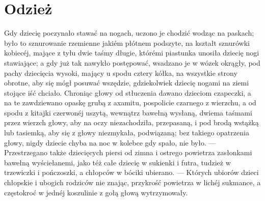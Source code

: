 \documentclass{book}
\begin{document}
\section{Odzież}

Gdy dziecię poczynało stawać na nogach, uczono je chodzić wodząc na paskach; było to sznurowanie rzemienne jakiém płótnem podszyte, na kształt sznurówki kobiecéj, mające z tyłu dwie taśmy długie, którémi piastunka unosiła dziecię nogi stawiające; a gdy już tak nawykło postępować, wsadzano je w wózek okrągły, pod pachy dziecięcia wysoki, mający u spodu cztery kółka, na wszystkie strony obrotne, aby się mógł posuwać wszędzie, gdziekolwiek dziecię nogami na ziemi stojące iść chciało. Chroniąc głowy od stłuczenia dawano dzieciom czapeczki, a na te zawdziewano opaskę grubą z axamitu, pospolicie czarnego z wierzchu, a od spodu z kitajki czerwonéj uszytą, wewnątrz bawełną wysłaną, dwiema taśmami przez wierzch głowy, aby na oczy niezachodziła, przepasaną, i pod brodą wstążką lub tasiemką, aby się z głowy niezmykała, podwiązaną; bez takiego opatrzenia głowy, nigdy dziecie chyba na noc w kolebce gdy spało, nie było. — Przestrzegano także dziecięcych piersi od zimna i ostrego powietrza zasłonkami bawełną wyściełanemi, jako téż całe dziecię w sukienki i futra, tudzież w trzewiczki i pończoszki, a chłopców w bóciki ubierano. — Których ubiorów dzieci chłopskie i ubogich rodziców nie znając, przykrość powietrza w lichéj sukmance, a częstokroć w jednéj koszulinie z gołą głową wytrzymowały.
\end{document}
